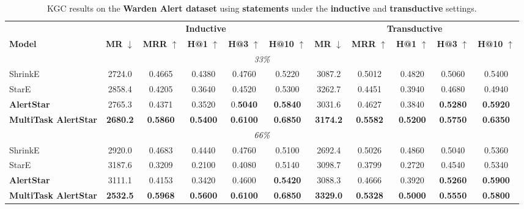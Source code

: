 \documentclass[10pt,journal,compsoc]{IEEEtran}
\begin{document}
\begin{table}[t]
\tiny
\centering
\caption{KGC results on the \textbf{Warden Alert dataset} using \textbf{statements} under the \textbf{inductive} and \textbf{transductive} settings.}
\label{tab:kgc_statements_warden}
\begin{tabular}{l ccccc ccccc}
\toprule
 & \multicolumn{5}{c}{\textbf{Inductive}} & \multicolumn{5}{c}{\textbf{Transductive}} \\
\cmidrule(lr){2-6} \cmidrule(lr){7-11}
\textbf{Model} & \textbf{MR} $\downarrow$ & \textbf{MRR} $\uparrow$ & \textbf{H@1} $\uparrow$ & \textbf{H@3} $\uparrow$ & \textbf{H@10} $\uparrow$ & \textbf{MR} $\downarrow$ & \textbf{MRR} $\uparrow$ & \textbf{H@1} $\uparrow$ & \textbf{H@3} $\uparrow$ & \textbf{H@10} $\uparrow$ \\
\midrule

\multicolumn{11}{c}{\textit{33\%}} \\
\cmidrule{1-11}
ShrinkE         & 2724.0 & 0.4665 & 0.4380 & 0.4760 & 0.5220 & 3087.2 & 0.5012 & 0.4820 & 0.5060 & 0.5400 \\
StarE           & 2858.4 & 0.4205 & 0.3640 & 0.4520 & 0.5300 & 3262.7 & 0.4451 & 0.3940 & 0.4680 & 0.4940 \\
\textbf{AlertStar}       & 2765.3 & 0.4371 & 0.3520 & 0.\textbf{5040} & \textbf{0.5840} & 3031.6 & 0.4627 & 0.3840 & \textbf{0.5280} & \textbf{0.5920} \\
\textbf{MultiTask AlertStar} & \textbf{2680.2} & \textbf{0.5860} & \textbf{0.5400} & \textbf{0.6100} & \textbf{0.6850} & \textbf{3174.2} & \textbf{0.5582} & \textbf{0.5200} & \textbf{0.5750} & \textbf{0.6350} \\
\midrule

\multicolumn{11}{c}{\textit{66\%}} \\
\cmidrule{1-11}
ShrinkE         & 2920.0 & 0.4683 & 0.4440 & 0.4760 & 0.5100 & 2692.4 & 0.5026 & 0.4860 & 0.5040 & 0.5360 \\
StarE           & 3187.6 & 0.3209 & 0.2100 & 0.4080 & 0.5140 & 3098.7 & 0.3799 & 0.2720 & 0.4540 & 0.5340 \\
\textbf{AlertStar}       & 3111.1 & 0.4153 & 0.3420 & 0.4600 & \textbf{0.5420} & 3088.3 & 0.4666 & 0.3920 & \textbf{0.5260} & \textbf{0.5900} \\
\textbf{MultiTask AlertStar} & \textbf{2532.5} & \textbf{0.5968} & \textbf{0.5600} & \textbf{0.6100} & \textbf{0.6850} & \textbf{3329.0} & \textbf{0.5328} & \textbf{0.5000} & \textbf{0.5550} & \textbf{0.5800} \\
\midrule


\end{tabular}
\end{table}
\end{document}
